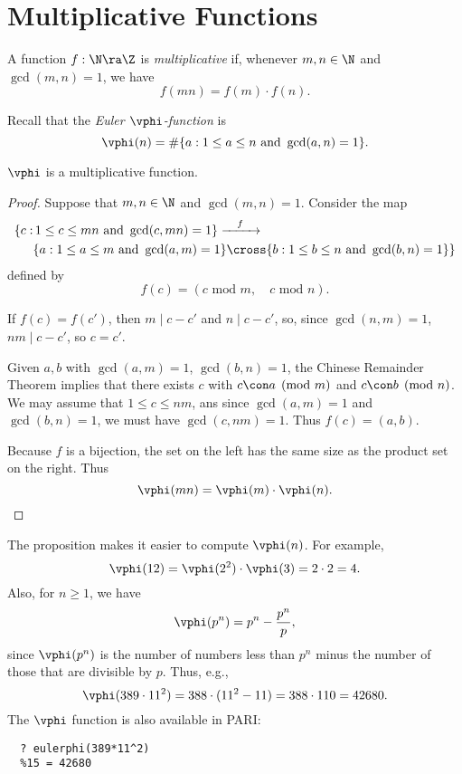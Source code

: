 \documentclass[11pt]{report}
\begin{document}
\section{Multiplicative Functions}
\begin{definition}
  A function $f:\N\ra \Z$ is
    {\em multiplicative} if, whenever $m, n\in\N$ and $\gcd(m,n)=1$, we have
  $$
    f(mn) = f(m)\cdot f(n).
  $$
\end{definition}
Recall that the {\em Euler $\vphi$-function} is
$$
  \vphi(n) = \#\{a : 1\leq a \leq n\text{ and }\gcd(a,n)=1\}.
$$
\begin{proposition}
  $\vphi$ is a multiplicative function.
\end{proposition}
\begin{proof}
  Suppose that $m,n\in\N$ and $\gcd(m,n)=1$.
  Consider the map
  \begin{align*}\{c : & \,1 \leq c \leq mn \text{ and }\gcd(c,mn)=1\}
              \xrightarrow{\quad f\quad }                                   \\
                    & \{a : 1 \leq a \leq m \text{ and }\gcd(a,m)=1\}\cross
              \{b : 1 \leq b \leq n \text{ and }\gcd(b,n)=1\}\}
  \end{align*}
  defined by
  $$
    f(c) = (c\text{ mod } m, \quad{}c \text{ mod }n).
  $$

    If $f(c)=f(c')$, then
  $m\mid c-c'$ and $n\mid c-c'$, so, since $\gcd(n,m)=1$,
  $nm\mid c-c'$, so $c=c'$.

   Given $a, b$ with $\gcd(a,m)=1$,
  $\gcd(b,n)=1$, the Chinese Remainder Theorem implies that there
  exists $c$ with $c\con a\pmod{m}$ and $c\con b\pmod{n}$.  We
  may assume that $1\leq c\leq nm$, ans since $\gcd(a,m)=1$ and
  $\gcd(b,n)=1$, we must have $\gcd(c,nm)=1$. Thus $f(c)=(a,b)$.

  Because $f$ is a bijection, the set on the left has the same
  size as the product set on the right.  Thus
  $$
    \vphi(mn) = \vphi(m)\cdot \vphi(n).
  $$
\end{proof}


\begin{example}
  The proposition makes it easier to compute $\vphi(n)$.
  For example,
  $$
    \vphi(12) = \vphi(2^2)\cdot \vphi(3) = 2\cdot 2 = 4.
  $$
  Also, for $n\geq 1$, we have
  $$
    \vphi(p^n) = p^n - \frac{p^n}{p},
  $$
  since $\vphi(p^n)$ is the number of numbers less than $p^n$
  minus the number of those that are divisible by $p$.
  Thus, e.g.,
  $$
    \vphi(389\cdot 11^2) = 388 \cdot (11^2 - 11) = 388\cdot 110 = 42680.
  $$
  The $\vphi$ function is also available in PARI:
  \begin{verbatim}
  ? eulerphi(389*11^2)
  %15 = 42680
\end{verbatim}
\end{example}
\end{document}
